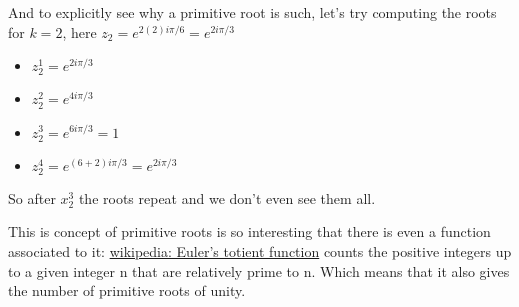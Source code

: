 And to explicitly see why a primitive root is such, let's try computing the roots for $k=2$, here $z_2 = e^{2(2)i\pi/6} = e^{2i\pi/3}$
\begin{itemize}
    \item $z_{2}^{1} = e^{2i\pi / 3}$
    \item $z_{2}^{2} = e^{4i\pi / 3}$
    \item $z_{2}^{3} = e^{6i\pi / 3} = 1$
    \item $z_{2}^{4} = e^{(6+2)i\pi / 3} = e^{2i\pi / 3}$
\end{itemize}

So after $x_{2}^{3}$ the roots repeat and we don't even see them all.

This is concept of primitive roots is so interesting that there is even a function associated to it:
\href{https://en.wikipedia.org/wiki/Euler%27s_totient_function}{wikipedia: Euler's totient function}
counts the positive integers up to a given integer n that are relatively prime to n.
Which means that it also gives the number of primitive roots of unity.